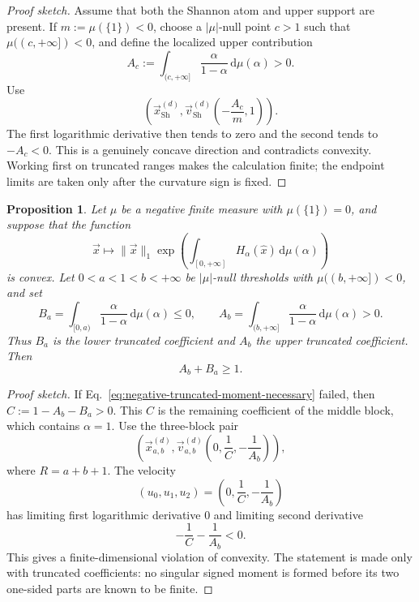 \documentclass[aps,pra,11pt,onecolumn,nofootinbib,tightenlines]{revtex4-2}
\newtheorem{proposition}[theorem]{Proposition}
\theoremstyle{definition}
\def \d {\mathrm{d}}
\begin{document}
\begin{proof}[Proof sketch]
Assume that both the Shannon atom and upper support are present.  If
$m:=\mu(\{1\})<0$, choose a $|\mu|$-null point $c>1$ such that
$\mu((c,+\infty])<0$, and define the localized upper contribution
\[
A_c:=\int_{(c,+\infty]}
\frac{\alpha}{1-\alpha}\,\d\mu(\alpha)>0.
\]
Use
\begin{equation}
\left(
\vec{x}_{\mathrm{Sh}}^{(d)},
\vec{v}_{\mathrm{Sh}}^{(d)}\!\left(-\frac{A_c}{m},1\right)
\right).
\label{eq:negative-Shannon-witness-pair}
\end{equation}
The first logarithmic derivative then tends to zero and the second tends to
$-A_c<0$.  This is a
genuinely concave direction and contradicts convexity.  Working first on
truncated ranges makes the calculation finite; the endpoint limits are taken only
after the curvature sign is fixed.
\end{proof}

\begin{proposition}
\label{prop:second-measure}
Let $\mu$ be a negative finite measure with $\mu(\{1\})=0$, and suppose that the
function
\begin{equation}
\vec{x}\longmapsto\|\vec{x}\|_1
\exp\!\left(\int_{[0,+\infty]}H_\alpha(\hat{x})\,
\d\mu(\alpha)\right)
\end{equation}
is convex.  Let $0<a<1<b<+\infty$ be $|\mu|$-null thresholds with
$\mu((b,+\infty])<0$, and set
\begin{equation}
B_a=\int_{[0,a)}\frac{\alpha}{1-\alpha}\,\d\mu(\alpha)\leq0,
\qquad
A_b=\int_{(b,+\infty]}\frac{\alpha}{1-\alpha}\,\d\mu(\alpha)>0.
\end{equation}
Thus $B_a$ is the lower truncated coefficient and $A_b$ the upper truncated
coefficient.
Then
\begin{equation}
\label{eq:negative-truncated-moment-necessary}
A_b+B_a\geq1.
\end{equation}
\end{proposition}

\begin{proof}[Proof sketch]
If Eq.~\eqref{eq:negative-truncated-moment-necessary} failed, then
$C:=1-A_b-B_a>0$.  This $C$ is the remaining coefficient of the middle
block, which contains $\alpha=1$.  Use the three-block pair
\begin{equation}
\left(
\vec{x}_{a,b}^{(d)},
\vec{v}_{a,b}^{(d)}\!\left(0,\frac1C,-\frac1{A_b}\right)
\right),
\label{eq:negative-moment-witness-pair}
\end{equation}
where $R=a+b+1$.  The velocity
\[
(u_0,u_1,u_2)=\left(0,\frac1C,-\frac1{A_b}\right)
\]
has limiting first logarithmic derivative $0$ and limiting second derivative
\[
-\frac1C-\frac1{A_b}<0.
\]
This gives a finite-dimensional violation of convexity.  The statement is made
only with truncated coefficients: no singular signed moment is formed before
its two one-sided parts are known to be finite.
\end{proof}
\end{document}
